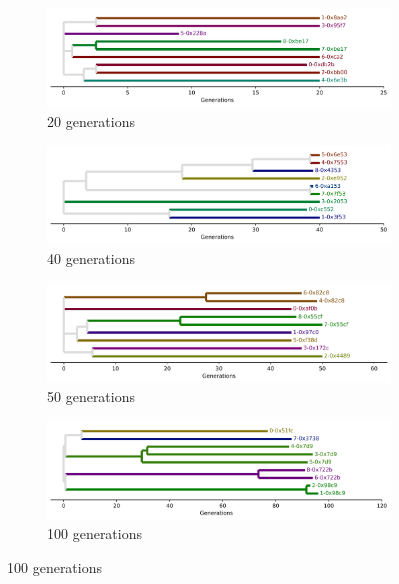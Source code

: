 \begin{figure}
  \begin{subfigure}[b]{\textwidth}
    \centering
    \includegraphics[width=\textwidth]{img/genome=hsurftiltedsticky_tagged+replicate=debd0010-f2aa-4679-aac6-b7ce94a2482a+viz=draw-biopython-tree+ext=}
    \caption{20 generations}
  \end{subfigure}

  \begin{subfigure}[b]{\textwidth}
    \centering
    \includegraphics[width=\textwidth]{img/genome=hsurftiltedsticky_tagged+replicate=14302969-8474-4577-806b-4540da18c605+viz=draw-biopython-tree+ext=}
    \caption{40 generations}
  \end{subfigure}

  \begin{subfigure}[b]{\textwidth}
    \centering
    \includegraphics[width=\textwidth]{img/genome=hsurftiltedsticky_tagged+replicate=c830e722-ad66-48ed-a02f-2aa994dfc268+viz=draw-biopython-tree+ext=}
    \caption{50 generations}
  \end{subfigure}

  \begin{subfigure}[b]{\textwidth}
    \centering
    \includegraphics[width=\textwidth]{img/genome=hsurftiltedsticky_tagged+replicate=a2438095-6857-4a68-bd77-14065953b13c+viz=draw-biopython-tree+ext=}
    \caption{100 generations}
  \end{subfigure}
\end{figure}
